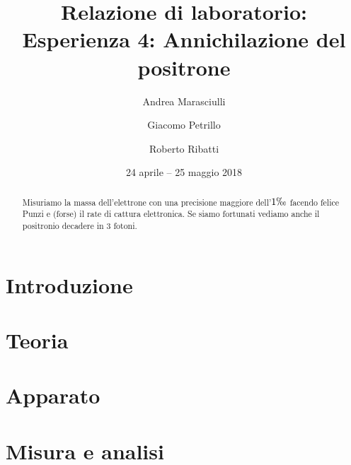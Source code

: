 \documentclass[a4paper]{article}
\title{Relazione di laboratorio:\\
Esperienza 4: Annichilazione del positrone}
\author{Andrea Marasciulli
\and Giacomo Petrillo
\and Roberto Ribatti}
\date{24 aprile -- 25 maggio 2018}
\begin{document}
\maketitle

\begin{abstract}

Misuriamo la massa dell'elettrone con una precisione maggiore dell'$1\permil$ facendo felice Punzi e (forse) il rate di cattura elettronica. Se siamo fortunati vediamo anche il positronio decadere in 3 fotoni.

\end{abstract}

{\tableofcontents}

\newpage
\section{Introduzione}



\section{Teoria}



\section{Apparato}





\section{Misura e analisi}

















\appendix
\end{document}
